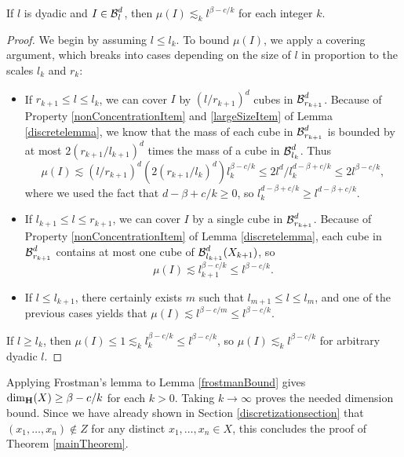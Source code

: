 \begin{lemma} \label{frostmanBound}
	If $l$ is dyadic and $I \in \operatorname{\mathcal{B}}_l^d$, then $\mu(I) \lesssim_k l^{\beta - c/k}$ for each integer $k$.
\end{lemma}
\begin{proof}
	We begin by assuming $l \leq l_k$. To bound $\mu(I)$, we apply a covering argument, which breaks into cases depending on the size of $l$ in proportion to the scales $l_k$ and $r_k$:
	\begin{itemize}
		\item If $r_{k+1} \leq l \leq l_k$, we can cover $I$ by $(l/r_{k+1})^d$ cubes in $\operatorname{\mathcal{B}}^d_{r_{k+1}}$. Because of Property \ref{nonConcentrationItem} and \ref{largeSizeItem} of Lemma \ref{discretelemma}, we know that the mass of each cube in $\operatorname{\mathcal{B}}^d_{r_{k+1}}$ is bounded by at most $2 (r_{k+1}/l_{k+1})^d$ times the mass of a cube in $\operatorname{\mathcal{B}}_{l_k}^d$. Thus
		\[ \mu(I) \lesssim (l/r_{k+1})^d (2(r_{k+1}/l_k)^d) l_k^{\beta - c/k} \leq 2l^d/l_k^{d - \beta + c/k} \leq 2l^{\beta - c/k}, \]
		where we used the fact that $d - \beta + c/k \geq 0$, so $l_k^{d - \beta + c/k} \geq l^{d - \beta + c/k}$.

		\item If $l_{k+1} \leq l \leq r_{k+1}$, we can cover $I$ by a single cube in $\operatorname{\mathcal{B}}^d_{r_{k+1}}$. Because of Property \ref{nonConcentrationItem} of Lemma \ref{discretelemma}, each cube in $\operatorname{\mathcal{B}}^d_{r_{k+1}}$ contains at most one cube of $\operatorname{\mathcal{B}}^d_{l_{k+1}}(X_{k+1})$, so
		\[ \mu(I) \lesssim l_{k+1}^{\beta - c/k} \leq l^{\beta - c/k}. \]

		\item If $l \leq l_{k+1}$, there certainly exists $m$ such that $l_{m+1} \leq l \leq l_m$, and one of the previous cases yields that $\mu(I) \lesssim l^{\beta - c/m} \leq l^{\beta - c/k}$.
	\end{itemize}
	If $l \geq l_k$, then $\mu(I) \leq 1 \lesssim_k l_k^{\beta - c/k} \leq l^{\beta - c/k}$, so $\mu(I) \lesssim_k l^{\beta - c/k}$ for arbitrary dyadic $l$.
\end{proof}

Applying Frostman's lemma to Lemma \ref{frostmanBound} gives $\operatorname{\dim_{\mathbf{H}}}(X) \geq \beta - c/k$ for each $k > 0$. Taking $k \to \infty$ proves the needed dimension bound. Since we have already shown in Section \ref{discretizationsection} that $(x_1, \dots, x_n) \not \in Z$ for any distinct $x_1, \dots, x_n \in X$, this concludes the proof of Theorem \ref{mainTheorem}.









